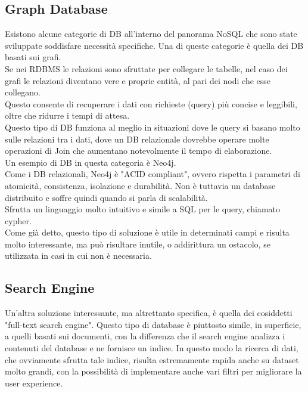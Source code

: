 \subsection{Graph Database}
Esistono alcune categorie di DB all'interno del panorama NoSQL che sono state sviluppate soddisfare necessità specifiche. Una di queste categorie è quella dei DB basati sui grafi.\\
Se nei RDBMS le relazioni sono sfruttate per collegare le tabelle, nel caso dei grafi le relazioni diventano vere e proprie entità, al pari dei nodi che esse collegano.\\
Questo consente di recuperare i dati con richieste (query) più concise e leggibili, oltre che ridurre i tempi di attesa.\\
Questo tipo di DB funziona al meglio in situazioni dove le query si basano molto sulle relazioni tra i dati, dove un DB relazionale dovrebbe operare molte operazioni di Join che aumentano notevolmente il tempo di elaborazione.\\

\noindent Un esempio di DB in questa categoria è Neo4j.\\
Come i DB relazionali, Neo4j è "ACID compliant", ovvero rispetta i parametri di atomicità, consistenza, isolazione e durabilità. Non è tuttavia un database distribuito e soffre quindi quando si parla di scalabilità.\\
Sfrutta un linguaggio molto intuitivo e simile a SQL per le query, chiamato cypher.\\

\noindent Come già detto, questo tipo di soluzione è utile in determinati campi e risulta molto interessante, ma può risultare inutile, o addirittura un ostacolo, se utilizzata in casi in cui non è necessaria.

\subsection{Search Engine}
Un'altra soluzione interessante, ma altrettanto specifica, è quella dei cosiddetti "full-text search engine". Questo tipo di database è piuttosto simile, in superficie, a quelli basati sui documenti, con la differenza che il search engine analizza i contenuti del database e ne fornisce un indice. In questo modo la ricerca di dati, che ovviamente sfrutta tale indice, risulta estremamente rapida anche su dataset molto grandi, con la possibilità di implementare anche vari filtri per migliorare la user experience.\\

